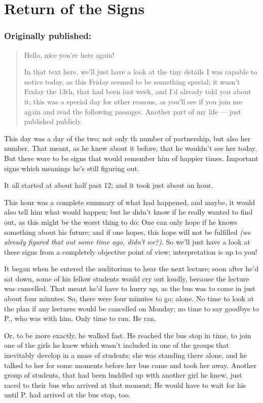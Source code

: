 \chapter{Return of the Signs}
\label{cha:return-signs}
\subsection*{Originally published: }
\begin{quote}
Hello, nice you're here again!

In that text here, we'll just have a look at the tiny details I was capable to notice today, as this Friday seemed to be something special; it wasn't Friday the 13th, that had been last week, and I'd already told you about it; this was a special day for other reasons, as you'll see if you join me again and read the following passages. Another part of my life --- just published publicly. 
\end{quote}

This day was a day of the two; not only th number of partnership, but also her number. That meant, as he knew about it before, that he wouldn't see her today.
But there were to be signs that would remember him of happier times. 
Important signs which meanings he's still figuring out.

It all started at about half past 12; and it took just about an hour. 

This hour was a complete summary of what had happened, and maybe, it would also tell him what would happen; but he didn't know if he really wanted to find out, as this might be the worst thing to do:
One can only hope if he knows something about his future; and if one hopes, this hope will not be fulfilled \emph{(we already figured that out some time ago, didn't we?)}. 
So we'll just have a look at these signs from a completely objective point of view; interpretation is up to you!

It began when he entered the auditorium to hear the next lecture; soon after he'd sat down, some of his fellow students would cry out loudly, because the lecture was cancelled. That meant he'd have to hurry up, as the bus was to come in just about four minutes. So, there were four minutes to go; alone. 
No time to look at the plan if any lectures would be cancelled on Monday; no time to say goodbye to P., who was with him. 
Only time to run. 
He ran.

Or, to be more exactly, he walked fast. 
He reached the bus stop in time, to join one of the girls he knew which wasn't included in one of the groups that inevitably develop in a mass of students; she was standing there alone, and he talked to her for some moments before her bus came and took her away. Another group of students, that had been huddled up with another girl he knew, just raced to their bus who arrived at that moment; He would have to wait for his until P. had arrived at the bus stop, too.

